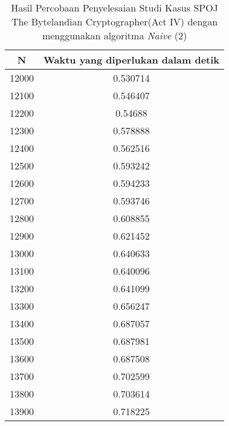 \begin{table}[H]
\centering
\begin{tabular}{|c|c|}\hline
N&Waktu yang diperlukan dalam detik\\ \hline
12000&0.530714\\ \hline
12100&0.546407\\ \hline
12200&0.54688\\ \hline
12300&0.578888\\ \hline
12400&0.562516\\ \hline
12500&0.593242\\ \hline
12600&0.594233\\ \hline
12700&0.593746\\ \hline
12800&0.608855\\ \hline
12900&0.621452\\ \hline
13000&0.640633\\ \hline
13100&0.640096\\ \hline
13200&0.641099\\ \hline
13300&0.656247\\ \hline
13400&0.687057\\ \hline
13500&0.687981\\ \hline
13600&0.687508\\ \hline
13700&0.702599\\ \hline
13800&0.703614\\ \hline
13900&0.718225\\ \hline
\end{tabular}
\caption {Hasil Percobaan Penyelesaian Studi Kasus SPOJ The Bytelandian Cryptographer(Act IV) dengan menggunakan algoritma \textit{Naive} (2)}
\label{tab:1res4}
\end{table}
